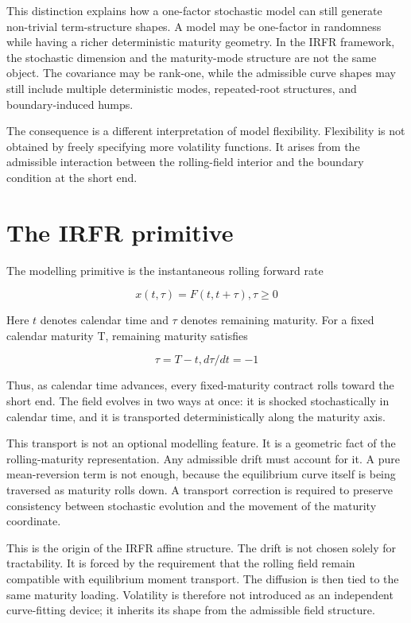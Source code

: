 \documentclass[11pt,oneside]{book}
\begin{document}
This distinction explains how a one-factor stochastic model can still
generate non-trivial term-structure shapes. A model may be one-factor in
randomness while having a richer deterministic maturity geometry. In the
IRFR framework, the stochastic dimension and the maturity-mode structure
are not the same object. The covariance may be rank-one, while the
admissible curve shapes may still include multiple deterministic modes,
repeated-root structures, and boundary-induced humps.

The consequence is a different interpretation of model flexibility.
Flexibility is not obtained by freely specifying more volatility
functions. It arises from the admissible interaction between the
rolling-field interior and the boundary condition at the short end.

\section{The IRFR primitive}\label{the-irfr-primitive}

The modelling primitive is the instantaneous rolling forward rate

\[
x(t,\tau) = F(t,t+\tau), \tau \ge 0
\]

Here \(t\) denotes calendar time and $\tau$ denotes remaining maturity. For a
fixed calendar maturity T, remaining maturity satisfies

\[
\tau = T - t, d\tau/dt = -1
\]

Thus, as calendar time advances, every fixed-maturity contract rolls
toward the short end. The field evolves in two ways at once: it is
shocked stochastically in calendar time, and it is transported
deterministically along the maturity axis.

This transport is not an optional modelling feature. It is a geometric
fact of the rolling-maturity representation. Any admissible drift must
account for it. A pure mean-reversion term is not enough, because the
equilibrium curve itself is being traversed as maturity rolls down. A
transport correction is required to preserve consistency between
stochastic evolution and the movement of the maturity coordinate.

This is the origin of the IRFR affine structure. The drift is not chosen
solely for tractability. It is forced by the requirement that the
rolling field remain compatible with equilibrium moment transport. The
diffusion is then tied to the same maturity loading. Volatility is
therefore not introduced as an independent curve-fitting device; it
inherits its shape from the admissible field structure.
\end{document}

